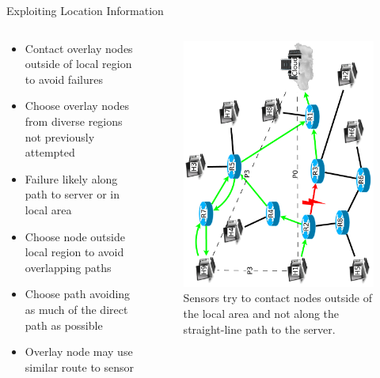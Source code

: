 \documentclass[pdftex]{beamer}
\begin{document}
\begin{frame}{Exploiting Location Information}
\begin{columns}
\begin{column}{.5\textwidth}

\begin{itemize}
	\item Contact overlay nodes outside of local region to avoid failures
	\item Choose overlay nodes from diverse regions not previously attempted
	\item Failure likely along path to server or in local area
	\item Choose node outside local	region to avoid overlapping	paths
	\item Choose path avoiding as much of the direct path as possible
	\item Overlay node may use similar route to sensor
\end{itemize}
\end{column}
	
\begin{column}{.5\textwidth}
\begin{figure}
\includegraphics[height=\textwidth,angle=-90]{exploiting_location_information}
\caption{Sensors try to contact nodes outside of the local area and not along the straight-line path to the server.}
\end{figure}
\end{column}

\end{columns}
\end{frame}
\end{document}
